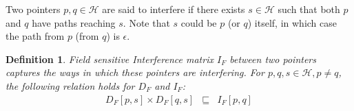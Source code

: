\documentclass[letterpaper]{sig-alternate}
\newtheorem{definition}{Definition}
\newcommand{\p}{\ensuremath{p}}
\newcommand{\q}{\ensuremath{q}}
\newcommand{\s}{\ensuremath{s}}
\newcommand{\heap}{\ensuremath{\mathcal{H}}}
\newcommand{\DFM}[2]{\ensuremath{D_F[#1,#2]}}
\newcommand{\IFM}[2]{\ensuremath{I_F[#1,#2]}}
\newcommand{\sub}[2]{\ensuremath{{#1}_{#2}}}
\begin{document}
Two pointers $\p,\q \in \heap$ are said to
interfere if there exists $\s \in \heap$ such that both
$\p$ and $\q$ have paths reaching $\s$. Note that $\s$ could
be $\p$ (or $\q$) itself, in which case the path from $\p$
(from $\q$) is $\epsilon$.

\begin{definition}\label{IFM_matrix}
Field sensitive Interference matrix $\sub{I}{F}$ between
two pointers captures the ways in which these pointers are
interfering. For $\p, \q, \s \in \heap, \p \not= \q$,
the following relation holds for $D_F$ and $I_F$: 
\begin{eqnarray*}
  \DFM{p}{s} \times \DFM{q}{s} &\sqsubseteq& \IFM{p}{q} \label {eq:rel-df-if}
\end{eqnarray*}
\end{definition}
\end{document}

